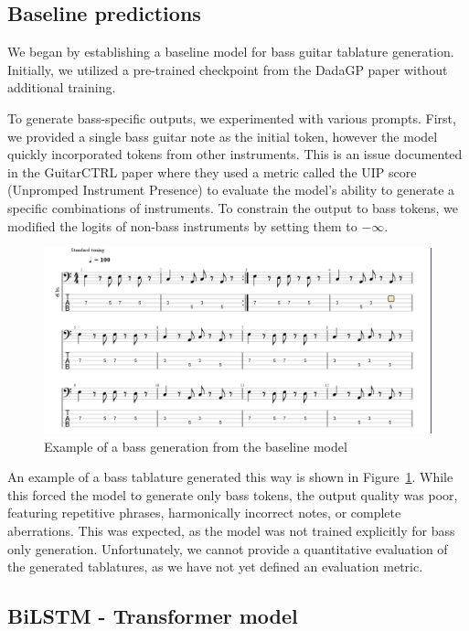 \subsection{Baseline predictions}

We began by establishing a baseline model for bass guitar tablature generation.
Initially, we utilized a pre-trained checkpoint from the DadaGP paper \cite{sarmento_dadagp_2021} without additional training.

To generate bass-specific outputs, we experimented with various prompts.
First, we provided a single bass guitar note as the initial token, however the model quickly incorporated tokens from other instruments.
This is an issue documented in the GuitarCTRL paper\cite{sarmento_gtr-ctrl_2023} where they used a metric called the UIP score (Unpromped Instrument Presence) to evaluate the model's ability to generate a specific combinations of instruments.
To constrain the output to bass tokens, we modified the logits of non-bass instruments by setting them to $-\infty$.

\begin{figure}[!ht]
    \centering
    \includegraphics[width=.75\linewidth]{../images-figures/generated_bass_baseline.png}
    \caption{Example of a bass generation from the baseline model}
    \label{fig:repetitive_generation}
\end{figure}

An example of a bass tablature generated this way is shown in Figure~\ref{fig:repetitive_generation}.
While this forced the model to generate only bass tokens, the output quality was poor, featuring repetitive phrases, harmonically incorrect notes, or complete aberrations.
This was expected, as the model was not trained explicitly for bass only generation. 
Unfortunately, we cannot provide a quantitative evaluation of the generated tablatures, as we have not yet defined an evaluation metric.

\subsection{BiLSTM - Transformer model}

